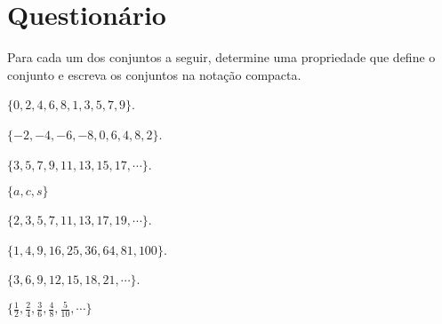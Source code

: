 
\section{Questionário}\label{sec:Questionario1part1}

\begin{questao}\label{test:Conjuntos1}
	Para cada um dos conjuntos a seguir, determine uma propriedade que define o conjunto e escreva os conjuntos na notação compacta.
\end{questao}

\begin{exerList}
	\item $\{0,2,4,6,8,1,3,5,7,9\}$.
	\item $\{-2, -4, -6, -8, 0, 6, 4, 8, 2\}$.
	\item $\{3, 5, 7, 9, 11, 13, 15, 17, \cdots\}$.
	\item $\{a, c, s\}$
	\item $\{2, 3, 5, 7, 11, 13, 17, 19, \cdots\}$.
	\item $\{1, 4, 9, 16, 25, 36, 64, 81, 100\}$.
	\item $\{3, 6, 9, 12, 15, 18, 21, \cdots\}$.
	\item $\Big\{\frac{1}{2}, \frac{2}{4}, \frac{3}{6}, \frac{4}{8}, \frac{5}{10}, \cdots\Big\}$
\end{exerList}

